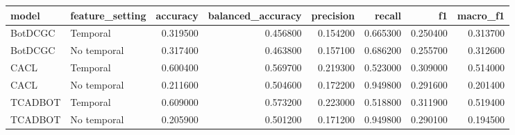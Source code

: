 \begin{tabular}{llrrrrrr}
\toprule
model & feature_setting & accuracy & balanced_accuracy & precision & recall & f1 & macro_f1 \\
\midrule
BotDCGC & Temporal & 0.319500 & 0.456800 & 0.154200 & 0.665300 & 0.250400 & 0.313700 \\
BotDCGC & No temporal & 0.317400 & 0.463800 & 0.157100 & 0.686200 & 0.255700 & 0.312600 \\
CACL & Temporal & 0.600400 & 0.569700 & 0.219300 & 0.523000 & 0.309000 & 0.514000 \\
CACL & No temporal & 0.211600 & 0.504600 & 0.172200 & 0.949800 & 0.291600 & 0.201400 \\
TCADBOT & Temporal & 0.609000 & 0.573200 & 0.223000 & 0.518800 & 0.311900 & 0.519400 \\
TCADBOT & No temporal & 0.205900 & 0.501200 & 0.171200 & 0.949800 & 0.290100 & 0.194500 \\
\bottomrule
\end{tabular}
